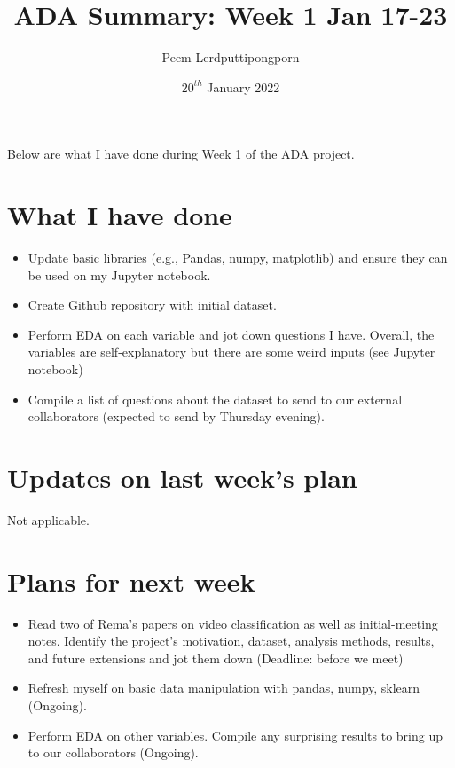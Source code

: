 \documentclass{article}
\title{ADA Summary: Week 1 Jan 17-23}
\author{Peem Lerdputtipongporn}
\date{$20^{th}$ January 2022}
\begin{document}
\maketitle

Below are what I have done during Week 1 of the ADA project.

\section{What I have done}

\begin{itemize}
    \item Update basic libraries (e.g., Pandas, numpy, matplotlib) and ensure
    they can be used on my Jupyter notebook.
    \item Create Github repository with initial dataset.
    \item Perform EDA on each variable and jot down questions I have.
    Overall, the variables are self-explanatory
    but there are some weird inputs (see Jupyter notebook)
    \item Compile a list of questions about the dataset to send to our external collaborators
    (expected to send by Thursday evening).
\end{itemize}

\section{Updates on last week's plan}

Not applicable.

\section{Plans for next week}

\begin{itemize}
  \item Read two of Rema's papers on video classification
  as well as initial-meeting notes. Identify the project's motivation,
  dataset, analysis methods, results, and future extensions and jot them down
  (Deadline: before we meet)
  \item Refresh myself on basic data manipulation with pandas, numpy, sklearn
  (Ongoing).
  \item Perform EDA on other variables. Compile any surprising results to bring up
  to our collaborators (Ongoing).
\end{itemize}
\end{document}
